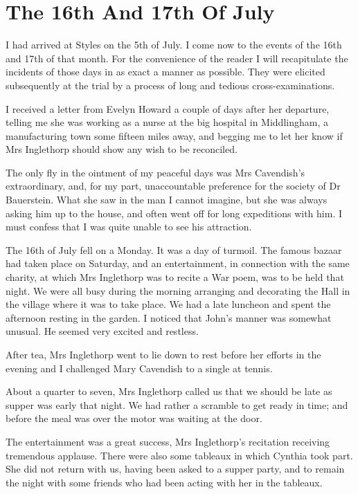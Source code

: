 \chapter{The 16th And 17th Of July} 
	
\lettrine{I}{} had arrived at Styles on the 5th of July. I come now to the events of the 16th and 17th of that month. For the convenience of the reader I will recapitulate the incidents of those days in as exact a manner as possible. They were elicited subsequently at the trial by a process of long and tedious cross-examinations. 

 I received a letter from Evelyn Howard a couple of days after her departure, telling me she was working as a nurse at the big hospital in Middlingham, a manufacturing town some fifteen miles away, and begging me to let her know if Mrs Inglethorp should show any wish to be reconciled. 

 The only fly in the ointment of my peaceful days was Mrs Cavendish's extraordinary, and, for my part, unaccountable preference for the society of Dr Bauerstein. What she saw in the man I cannot imagine, but she was always asking him up to the house, and often went off for long expeditions with him. I must confess that I was quite unable to see his attraction. 

 The 16th of July fell on a Monday. It was a day of turmoil. The famous bazaar had taken place on Saturday, and an entertainment, in connection with the same charity, at which Mrs Inglethorp was to recite a War poem, was to be held that night. We were all busy during the morning arranging and decorating the Hall in the village where it was to take place. We had a late luncheon and spent the afternoon resting in the garden. I noticed that John's manner was somewhat unusual. He seemed very excited and restless. 

 After tea, Mrs Inglethorp went to lie down to rest before her efforts in the evening and I challenged Mary Cavendish to a single at tennis. 

 About a quarter to seven, Mrs Inglethorp called us that we should be late as supper was early that night. We had rather a scramble to get ready in time; and before the meal was over the motor was waiting at the door. 

 The entertainment was a great success, Mrs Inglethorp's recitation receiving tremendous applause. There were also some tableaux in which Cynthia took part. She did not return with us, having been asked to a supper party, and to remain the night with some friends who had been acting with her in the tableaux. 

